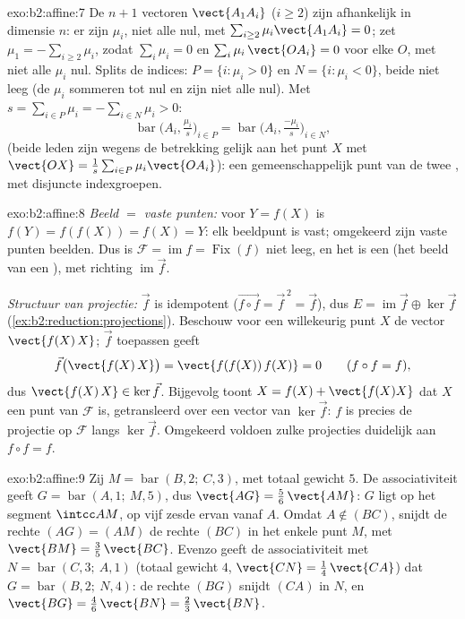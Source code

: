 \begin{solution}{exo:b2:affine:7}
De $n + 1$ vectoren $\vect{A_1A_i}$ ($i \geq 2$) zijn afhankelijk
in dimensie $n$: er zijn $\mu_i$, niet alle nul, met
$\sum_{i\geq2} \mu_i\vect{A_1A_i} = 0$; zet $\mu_1 = -\sum_{i \geq
2}\mu_i$, zodat $\sum_{i}\mu_i = 0$ en $\sum_i \mu_i\,\vect{OA_i} =
0$ voor elke $O$, met niet alle $\mu_i$ nul. Splits de indices: $P
= \{i : \mu_i > 0\}$ en $N = \{i : \mu_i < 0\}$, beide niet leeg
(de $\mu_i$ sommeren tot nul en zijn niet alle nul). Met $s =
\sum_{i\in P}\mu_i = -\sum_{i \in N}\mu_i > 0$:
\[
\operatorname{bar}\bigl(A_i, \tfrac{\mu_i}{s}\bigr)_{i \in P}
= \operatorname{bar}\bigl(A_i, \tfrac{-\mu_i}{s}\bigr)_{i \in N},
\]
(beide leden zijn wegens de betrekking gelijk aan het punt $X$ met
$\vect{OX} = \frac1s\sum_{i\in P}\mu_i\vect{OA_i}$): een
gemeenschappelijk punt van de twee , met disjuncte
indexgroepen.
\end{solution}

\begin{solution}{exo:b2:affine:8}
\emph{Beeld $=$ vaste punten:} voor $Y = f(X)$ is $f(Y) = f(f(X)) =
f(X) = Y$: elk beeldpunt is vast; omgekeerd zijn vaste punten
beelden. Dus is $\mathcal{F} = \operatorname{im} f =
\operatorname{Fix}(f)$ niet leeg, en het is een 
(het beeld van een ), met richting
$\operatorname{im}\vec f$.

\emph{Structuur van projectie:} $\vec f$ is idempotent ($\vec{f\circ
f} = \vec f^{\,2} = \vec f$), dus $E = \operatorname{im}\vec f
\oplus \ker \vec f$ (\cref{ex:b2:reduction:projections}). Beschouw
voor een willekeurig punt $X$ de vector $\vect{f(X)\,X}$; $\vec f$
toepassen geeft
\[
\vec f\bigl(\vect{f(X)\,X}\bigr) = \vect{f(f(X))\,f(X)} = 0
\qquad (f \circ f = f),
\]
dus $\vect{f(X)\,X} \in \ker\vec f$. Bijgevolg toont $X = f(X) +
\vect{f(X)X}$ dat $X$ een punt van $\mathcal{F}$ is, getransleerd
over een vector van $\ker\vec f$: $f$ is precies de projectie op
$\mathcal{F}$ langs $\ker\vec f$. Omgekeerd voldoen zulke
projecties duidelijk aan $f \circ f = f$.
\end{solution}

\begin{solution}{exo:b2:affine:9}
Zij $M = \operatorname{bar}(B, 2;\ C, 3)$, met totaal gewicht $5$.
De associativiteit geeft $G = \operatorname{bar}(A, 1;\ M, 5)$, dus
$\vect{AG} = \frac56\,\vect{AM}$: $G$ ligt op het segment $\intcc
AM$, op vijf zesde ervan vanaf $A$. Omdat $A \notin (BC)$, snijdt
de rechte $(AG) = (AM)$ de rechte $(BC)$ in het enkele punt $M$,
met $\vect{BM} = \frac35\,\vect{BC}$. Evenzo geeft de
associativiteit met $N = \operatorname{bar}(C, 3;\ A, 1)$ (totaal
gewicht $4$, $\vect{CN} = \frac14\,\vect{CA}$) dat $G =
\operatorname{bar}(B, 2;\ N, 4)$: de rechte $(BG)$ snijdt $(CA)$ in
$N$, en $\vect{BG} = \frac46\,\vect{BN} = \frac23\,\vect{BN}$.
\end{solution}

